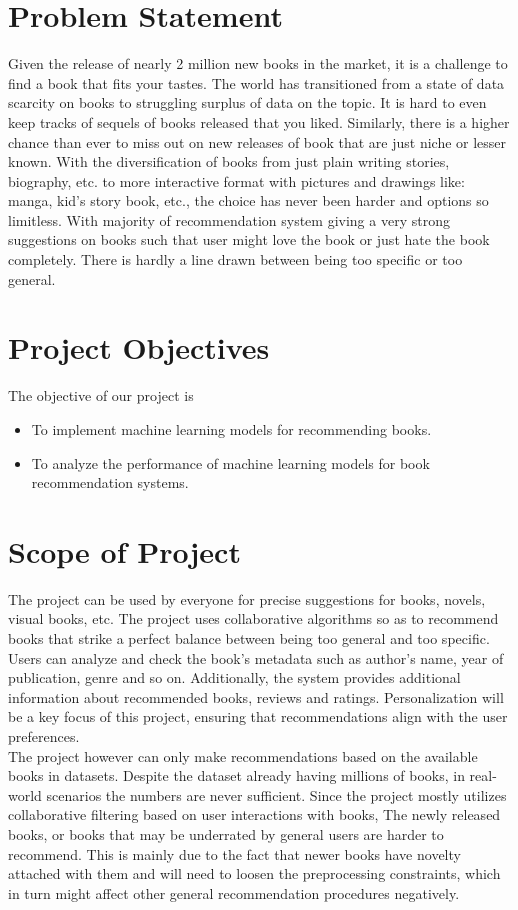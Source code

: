 \section{Problem Statement}

Given the release of nearly 2 million new books in the market, it is a challenge to find a book that fits your tastes. The world has transitioned from a state of data scarcity on books to struggling surplus of data on the topic. It is hard to even keep tracks of sequels of books released that you liked. Similarly, there is a higher chance than ever to miss out on new releases of book that are just niche or lesser known. With the diversification of books from just plain writing stories, biography, etc. to more interactive format with pictures and drawings like: manga, kid's story book, etc., the choice has never been harder and options so limitless. With majority of recommendation system giving a very strong suggestions on books such that user might love the book or just hate the book completely. There is hardly a line drawn between being too specific or too general.

\section{Project Objectives}
The objective of our project is
\begin{itemize}
    \item To implement machine learning models for recommending books.
    \item To analyze the performance of machine learning models for book recommendation systems.
\end{itemize} 

\section{Scope of Project}

The project can be used by everyone for precise suggestions for books, novels, visual books, etc. The project uses collaborative algorithms so as to recommend books that strike a perfect balance between being too general and too specific. Users can analyze and check the book's metadata such as author's name, year of publication, genre and so on. Additionally, the system provides additional information about recommended books, reviews and ratings. Personalization will be a key focus of this project, ensuring that recommendations align with the user preferences. \\
The project however can only make recommendations based on the available books in datasets. Despite the dataset already having millions of books, in real-world scenarios the numbers are never sufficient. Since the project mostly utilizes collaborative filtering based on user interactions with books, The newly released books, or books that may be underrated by general users are harder to recommend. This is mainly due to the fact that newer books have novelty attached with them and will need to loosen the preprocessing constraints, which in turn might affect other general recommendation procedures negatively.

